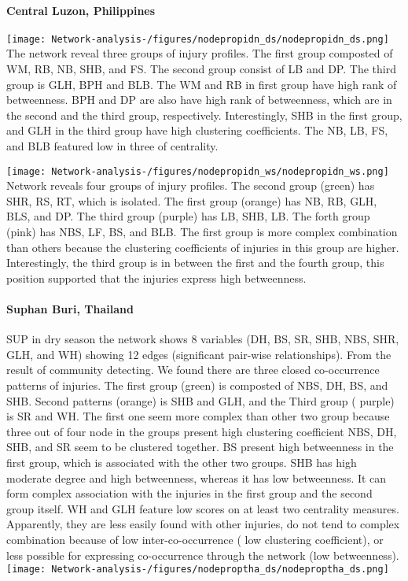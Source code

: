 \paragraph{Central Luzon, Philippines}

\texttt{[image: Network-analysis-/figures/nodepropidn\_ds/nodepropidn\_ds.png]}
The network reveal three groups of injury profiles. The first group composted of WM, RB, NB, SHB, and FS. The second group consist of LB and DP. The third group is GLH, BPH and BLB.  The WM and RB in first group have high rank of betweenness. BPH and DP are also have high rank of betweenness, which are in the second and the third group, respectively. Interestingly, SHB in the first group, and GLH in the third group have high clustering coefficients. The NB, LB, FS, and BLB featured low in three of centrality. 

\texttt{[image: Network-analysis-/figures/nodepropidn\_ws/nodepropidn\_ws.png]}
Network reveals four groups of injury profiles. The second group (green) has  SHR, RS, RT, which is isolated. The first group (orange) has NB, RB, GLH, BLS, and DP. The third group (purple) has LB, SHB, LB. The forth group (pink) has NBS, LF, BS, and BLB. The first group is more complex combination than others because the clustering coefficients of injuries in this group are higher. Interestingly, the third group is in between the first and the fourth group, this position supported that the injuries express high betweenness. 

\paragraph{Suphan Buri, Thailand}


SUP in dry season the network shows  8 variables (DH, BS, SR, SHB, NBS, SHR, GLH, and WH) showing 12 edges (significant pair-wise relationships).  From the result of community detecting.  We found there are three closed co-occurrence patterns of injuries. The first group (green) is composted of NBS, DH, BS, and SHB. Second patterns (orange) is SHB and GLH, and the Third group ( purple) is SR and WH. The first  one seem more complex than other two group because three out of four node in the groups present high clustering coefficient NBS, DH, SHB,  and SR seem to be clustered together.  BS present high betweenness in the first group, which is associated with the other two groups. SHB has high moderate degree and high betweenness, whereas  it has low betweenness.  It can form complex association with the injuries in the first group and the second group itself.  WH and GLH feature low scores on at least two centrality measures.  Apparently, they are less easily found with other injuries, do not tend to complex combination because of low inter-co-occurrence ( low clustering coefficient), or less possible for expressing co-occurrence through the network (low betweenness). 
\texttt{[image: Network-analysis-/figures/nodeproptha\_ds/nodeproptha\_ds.png]}

